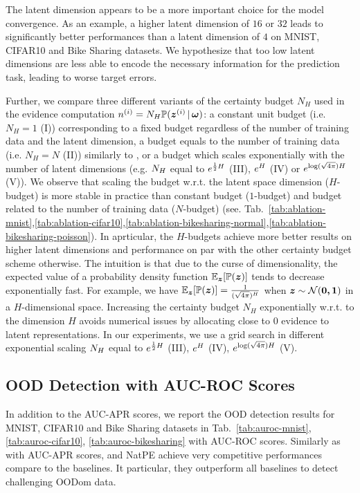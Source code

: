 The latent dimension appears to be a more important choice for the model convergence. As an example, a higher latent dimension of $16$ or $32$ leads to significantly better performances than a latent dimension of $4$ on MNIST, CIFAR10 and Bike Sharing datasets. We hypothesize that too low latent dimensions are less able to encode the necessary information for the prediction task, leading to worse target errors.

Further, we compare three different variants of the certainty budget $N_H$ used in the evidence computation $n^{(i)} = N_H\mathbb{P}(\bm{z}^{(i)} \,|\, \bm{\omega})$: a constant unit budget (i.e. $N_H=1$ (I)) corresponding to a fixed budget regardless of the number of training data and the latent dimension, a budget equals to the number of training data (i.e. $N_H=N$ (II)) similarly to \citet{charpentier2020}, or a budget which scales exponentially with the number of latent dimensions (e.g. $N_H$ equal to $e^{\frac{1}{2}H}$ (III), $e^{H}$ (IV) or $e^{\log(\sqrt{4\pi})H}$ (V)). We observe that scaling the budget w.r.t. the latent space dimension ($H$-budget) is more stable in practice than constant budget ($1$-budget) and budget related to the number of training data ($N$-budget) (see. Tab.~\ref{tab:ablation-mnist},\ref{tab:ablation-cifar10},\ref{tab:ablation-bikesharing-normal},\ref{tab:ablation-bikesharing-poisson}). In aprticular, the $H$-budgets achieve more  better results on higher latent dimensions and performance on par with the other certainty budget scheme otherwise. The intuition is that due to the curse of dimensionality, the expected value of a probability density function $\operatorname{\mathbb{E}}_{\bm{z}}[\mathbb{P}(\bm{z})]$ tends to decrease exponentially fast. For example, we have $\operatorname{\mathbb{E}}_{\bm{z}}[\mathbb{P}(\bm{z})] = \frac{1}{(\sqrt{4\pi})^H}$ when $\bm{z} \sim \operatorname{\mathcal{N}}(\bm{0, \bm{1}})$ in a $H$-dimensional space. Increasing the certainty budget $N_H$ exponentially w.r.t. to the dimension $H$ avoids numerical issues by allocating close to $0$ evidence to latent representations. In our experiments, we use a grid search in different exponential scaling $N_H$ equal to $e^{\frac{1}{2}H}$ (III), $e^{H}$ (IV),  $e^{\log(\sqrt{4\pi})H}$ (V).

\subsection{OOD Detection with AUC-ROC Scores}
\label{sec:auroc}

In addition to the AUC-APR scores, we report the OOD detection results for MNIST, CIFAR10 and Bike Sharing datasets in Tab.~\ref{tab:auroc-mnist}, \ref{tab:auroc-cifar10}, \ref{tab:auroc-bikesharing} with AUC-ROC scores. Similarly as with AUC-APR scores, \NatPNacro{} and NatPE achieve very competitive performances compare to the baselines. It particular, they outperform all baselines to detect challenging OODom data.

